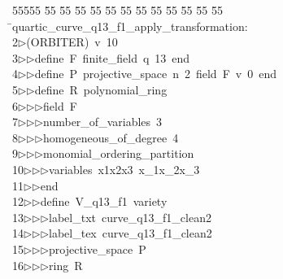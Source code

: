 %
%
\begin{tabbing}
55555 \= 55 \= 55 \= 55 \= 55 \= 55 \= 55 \= 55 \= 55 \= 55 \= 55 \= 55 \= 55 \= \>quartic\_curve\_q13\_f1\_apply\_transformation:\\[0pt]
2\>$\triangleright$\>(ORBITER)\ v\ 10\ \\[0pt]
3\>$\triangleright$\>$\triangleright$\>define\ F\ finite\_field\ q\ 13\ end\ \\[0pt]
4\>$\triangleright$\>$\triangleright$\>define\ P\ projective\_space\ n\ 2\ field\ F\ v\ 0\ end\ \\[0pt]
5\>$\triangleright$\>$\triangleright$\>define\ R\ polynomial\_ring\ \\[0pt]
6\>$\triangleright$\>$\triangleright$\>$\triangleright$\>field\ F\ \\[0pt]
7\>$\triangleright$\>$\triangleright$\>$\triangleright$\>number\_of\_variables\ 3\ \\[0pt]
8\>$\triangleright$\>$\triangleright$\>$\triangleright$\>homogeneous\_of\_degree\ 4\ \\[0pt]
9\>$\triangleright$\>$\triangleright$\>$\triangleright$\>monomial\_ordering\_partition\ \\[0pt]
10\>$\triangleright$\>$\triangleright$\>$\triangleright$\>variables\ x1x2x3\ x\_1x\_2x\_3\ \\[0pt]
11\>$\triangleright$\>$\triangleright$\>end\ \\[0pt]
12\>$\triangleright$\>$\triangleright$\>define\ V\_q13\_f1\ variety\ \\[0pt]
13\>$\triangleright$\>$\triangleright$\>$\triangleright$\>label\_txt\ curve\_q13\_f1\_clean2\ \\[0pt]
14\>$\triangleright$\>$\triangleright$\>$\triangleright$\>label\_tex\ curve\_q13\_f1\_clean2\ \\[0pt]
15\>$\triangleright$\>$\triangleright$\>$\triangleright$\>projective\_space\ P\ \\[0pt]
16\>$\triangleright$\>$\triangleright$\>$\triangleright$\>ring\ R\ \\[0pt]

\end{tabbing}
